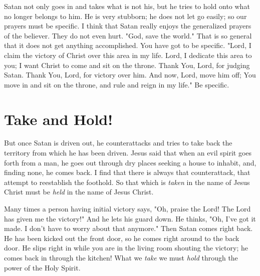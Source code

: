 Satan not only goes in and takes what is not his, but he tries to hold onto what no longer belongs to him. He is very stubborn; he does not let go easily; so our prayers must be specific. I think that Satan really enjoys the generalized prayers of the believer. They do not even hurt. "God, save the world." That is so general that it does not get anything accomplished. You have got to be specific. "Lord, I claim the victory of Christ over this area in my life. Lord, I dedicate this area to you; I want Christ to come and sit on the throne. Thank You, Lord, for judging Satan. Thank You, Lord, for victory over him. And now, Lord, move him off; You move in and sit on the throne, and rule and reign in my life." Be specific. 

\section*{Take and Hold!}

But once Satan is driven out, he counterattacks and tries to take back the territory from which he has been driven. Jesus said that when an evil spirit goes forth from a man, he goes out through dry places seeking a house to inhabit, and, finding none, he comes back. I find that there is always that counterattack, that attempt to reestablish the foothold. So that which is \emph{taken} in the name of Jesus Christ must be \emph{held} in the name of Jesus Christ. 

Many times a person having initial victory says, "Oh, praise the Lord! The Lord has given me the victory!" And he lets his guard down. He thinks, "Oh, I've got it made. I don't have to worry about that anymore." Then Satan comes right back. He has been kicked out the front door, so he comes right around to the back door. He slips right in while you are in the living room shouting the victory; he comes back in through the kitchen! What we \emph{take} we must \emph{hold} through the power of the Holy Spirit. 



